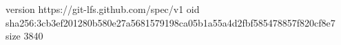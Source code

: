version https://git-lfs.github.com/spec/v1
oid sha256:3cb3ef201280b580e27a5681579198ca05b1a55a4d2fbf585478857f820cf8e7
size 3840
